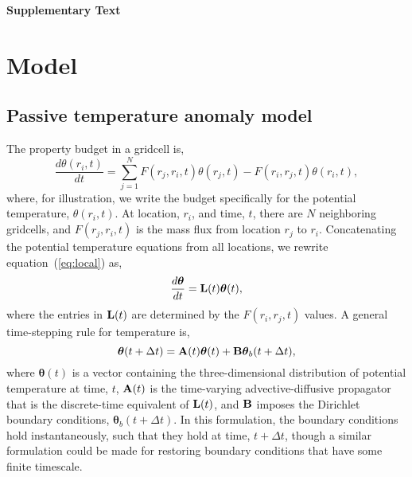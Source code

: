 \documentclass[12pt]{article}
\begin{document}
\newpage

{\bf {\Large Supplementary Text}}

\section{Model}

\subsection{Passive temperature anomaly model}

The property budget in a gridcell is,
\begin{equation}
\label{eq:local}
\frac{d\theta(r_i,t)}{dt} = \sum_{j=1}^N F(r_j,r_i,t)\theta(r_j,t) -F(r_i,r_j,t)\theta(r_i,t),
\end{equation}
where, for illustration, we write the budget specifically for the
potential temperature, $\theta(r_i,t)$.  At location, $r_i$, and time,
$t$, there are $N$ neighboring gridcells, and $F(r_j,r_i,t)$ is the
mass flux from location $r_j$ to $r_i$.  Concatenating the potential
temperature equations from all locations, we rewrite
equation~(\ref{eq:local}) as,
\begin{equation}
\label{eq:tendency1}
\frac{d{\boldsymbol \theta}}{dt} = {\bf L}(t) {\boldsymbol \theta}(t),
\end{equation}
where the entries in ${\bf L}(t)$ are determined by the $F(r_i,r_j,t)$ values. A general time-stepping rule for temperature is,
\begin{equation}
\label{eq:timestepping}
{\boldsymbol \theta}(t+ \Delta t) = {\bf A}(t) {\boldsymbol \theta}(t) + {\bf B} {\boldsymbol \theta}_{b}(t+\Delta t), 
\end{equation}
where ${\boldsymbol \theta}(t)$ is a vector containing the
three-dimensional distribution of potential temperature at time, $t$,
${\bf A}(t)$ is the time-varying advective-diffusive propagator that
is the discrete-time equivalent of ${\bf L}(t)$, and ${\bf B}$ imposes
the Dirichlet boundary conditions,
${\boldsymbol \theta}_{b}(t+\Delta t)$. In this formulation, the
boundary conditions hold instantaneously, such that they hold at time,
$t+{\Delta}t$, though a similar formulation could be made for
restoring boundary conditions that have some finite timescale.
\end{document}
